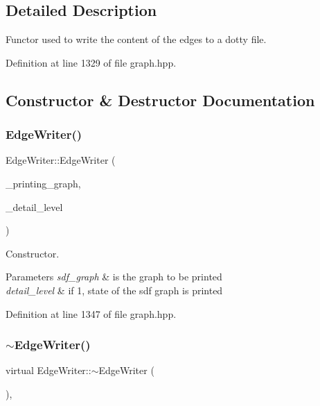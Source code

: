\subsection{Detailed Description}
Functor used to write the content of the edges to a dotty file. 

Definition at line 1329 of file graph.\+hpp.



\subsection{Constructor \& Destructor Documentation}
\mbox{\label{classEdgeWriter_a48548d050674877665360af8f9a9842a}} 
\subsubsection{\texorpdfstring{Edge\+Writer()}{EdgeWriter()}}
{\footnotesize\ttfamily Edge\+Writer\+::\+Edge\+Writer (\begin{DoxyParamCaption}\item[{const \hyperlink{structgraph}{graph} $\ast$}]{\+\_\+printing\+\_\+graph,  }\item[{const int}]{\+\_\+detail\+\_\+level }\end{DoxyParamCaption})\hspace{0.3cm}{\ttfamily [inline]}}



Constructor. 


\begin{DoxyParams}{Parameters}
{\em sdf\+\_\+graph} & is the graph to be printed \\
\hline
{\em detail\+\_\+level} & if 1, state of the sdf graph is printed \\
\hline
\end{DoxyParams}


Definition at line 1347 of file graph.\+hpp.

\mbox{\label{classEdgeWriter_a6b5960848a2b661fedc561861e0968c9}} 
\subsubsection{\texorpdfstring{$\sim$\+Edge\+Writer()}{~EdgeWriter()}}
{\footnotesize\ttfamily virtual Edge\+Writer\+::$\sim$\+Edge\+Writer (\begin{DoxyParamCaption}{ }\end{DoxyParamCaption})\hspace{0.3cm}{\ttfamily [inline]}, {\ttfamily [virtual]}}



